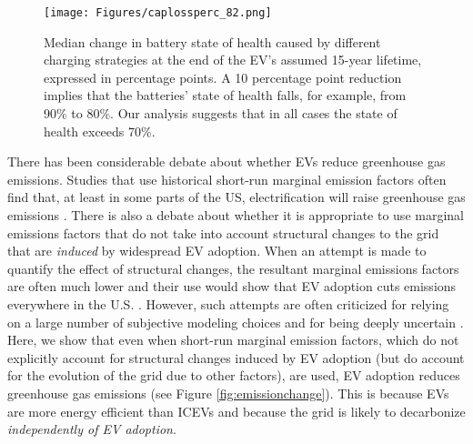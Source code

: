 \documentclass[11pt,preprint]{elsarticle}
\begin{document}
\begin{figure*}
    \centering
    \texttt{[image: Figures/caplossperc\_82.png]}
    \caption{Median change in battery state of health caused by different charging strategies at the end of the EV's assumed 15-year lifetime, expressed in percentage points. A 10 percentage point reduction implies that the batteries' state of health falls, for example, from 90\% to 80\%. Our analysis suggests that in all cases the state of health exceeds 70\%.}
    \label{fig:caploss82perc}
\end{figure*}



There has been considerable debate about whether EVs reduce greenhouse gas emissions. Studies that use historical short-run marginal emission factors often find that, at least in some parts of the US, electrification will raise greenhouse gas emissions \cite{singh_ensuring_2024,holland_why_2022}. There is also a debate about whether it is appropriate to use marginal emissions factors that do not take into account structural changes to the grid that are \textit{induced} by widespread EV adoption\cite{holland_why_2022,gagnon_short-run_2022,vaishnav_how_2023}. When an attempt is made to quantify the effect of structural changes, the resultant marginal emissions factors are often much lower and their use would show that EV adoption cuts emissions everywhere in the U.S. \cite{gagnon_planning_2022}. However, such attempts are often criticized for relying on a large number of subjective modeling choices and for being deeply uncertain \cite{holland_why_2022,gagnon_short-run_2022}. Here, we show that even when short-run marginal emission factors, which do not explicitly account for structural changes induced by EV adoption (but do account for the evolution of the grid due to other factors), are used, EV adoption reduces greenhouse gas emissions (see Figure \ref{fig:emissionchange}). This is because EVs are more energy efficient than ICEVs and because the grid is likely to decarbonize \textit{independently of EV adoption}.  

\end{document}
